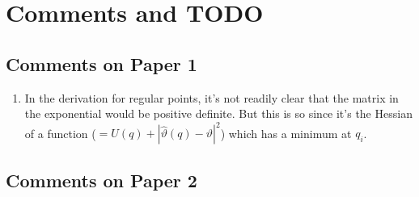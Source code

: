 
\chapter{Comments and TODO}

\section{Comments on Paper 1}

\begin{enumerate}
  \item In the derivation for regular points, it's not readily clear that the matrix in the exponential would be positive definite.  But this is so since it's the Hessian of a function ($=U(q) + |\hat{\vartheta}(q) - \vartheta|^{2}$) which has a minimum at $q_{i}$.
\end{enumerate}

\section{Comments on Paper 2}

